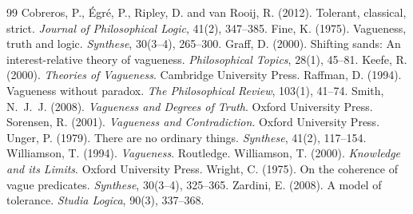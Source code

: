 \documentclass{situationist-preprint}
\begin{document}
\begin{thebibliography}{99}\small
{} Cobreros, P., \'Egr\'e, P., Ripley, D. and van Rooij, R. (2012). Tolerant, classical, strict. \emph{Journal of Philosophical Logic}, 41(2), 347--385.
 Fine, K. (1975). Vagueness, truth and logic. \emph{Synthese}, 30(3--4), 265--300.
 Graff, D. (2000). Shifting sands: An interest-relative theory of vagueness. \emph{Philosophical Topics}, 28(1), 45--81.
 Keefe, R. (2000). \emph{Theories of Vagueness}. Cambridge University Press.
 Raffman, D. (1994). Vagueness without paradox. \emph{The Philosophical Review}, 103(1), 41--74.
 Smith, N.~J.~J. (2008). \emph{Vagueness and Degrees of Truth}. Oxford University Press.
 Sorensen, R. (2001). \emph{Vagueness and Contradiction}. Oxford University Press.
 Unger, P. (1979). There are no ordinary things. \emph{Synthese}, 41(2), 117--154.
 Williamson, T. (1994). \emph{Vagueness}. Routledge.
 Williamson, T. (2000). \emph{Knowledge and its Limits}. Oxford University Press.
 Wright, C. (1975). On the coherence of vague predicates. \emph{Synthese}, 30(3--4), 325--365.
 Zardini, E. (2008). A model of tolerance. \emph{Studia Logica}, 90(3), 337--368.
\end{thebibliography}
\end{document}
